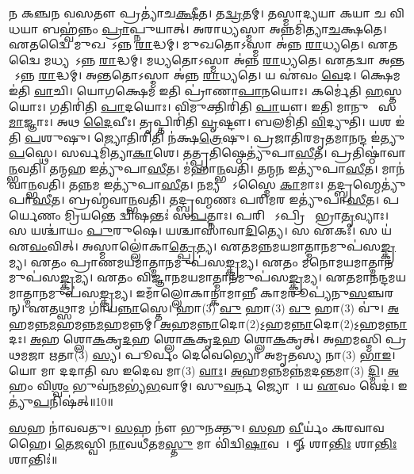 𑌨 𑌕𑌞𑍍𑌚𑌨 𑌵𑌸𑌤𑍗 𑌪𑍍𑌰𑌤𑍍𑌯𑌾॑𑌚\ul{𑌕𑍍𑌷𑍀}𑌤। 
𑌤\ul{𑌦𑍍𑌵𑍍𑌰}𑌤𑌮𑍍। 
𑌤𑌸𑍍𑌮𑌾𑌦𑍍𑌯𑌯𑌾 𑌕𑌯𑌾 𑌚 𑌵𑌿𑌧𑌯𑌾 𑌬𑌹𑍍𑌵॑𑌨𑍍𑌨𑌂 \ul{𑌪𑍍𑌰𑌾}𑌪𑍍𑌨𑍁𑌯𑌾𑌤𑍍। 
𑌅𑌰𑌾𑌧𑍍𑌯𑌸𑍍𑌮𑌾 𑌅𑌨𑍍𑌨𑌮𑌿॑𑌤𑍍𑌯𑌾\ul{𑌚}𑌕𑍍𑌷𑌤𑍇। 
𑌏𑌤𑌦𑍍𑌵𑍈 𑌮𑍁𑌖𑌤𑍋᳚𑌽𑌨𑍍𑌨 \ul{𑌰𑌾}𑌦𑍍𑌧𑌮𑍍। 
𑌮𑍁𑌖𑌤𑍋𑌽𑌸𑍍𑌮𑌾 𑌅॑𑌨𑍍𑌨 \ul{𑌰𑌾}𑌧𑍍𑌯𑌤𑍇। 
𑌏𑌤𑌦𑍍𑌵𑍈 𑌮𑌧𑍍𑌯𑌤𑍋᳚𑌽𑌨𑍍𑌨 \ul{𑌰𑌾}𑌦𑍍𑌧𑌮𑍍। 
𑌮𑌧𑍍𑌯𑌤𑍋𑌽𑌸𑍍𑌮𑌾 𑌅॑𑌨𑍍𑌨 \ul{𑌰𑌾}𑌧𑍍𑌯𑌤𑍇। 
𑌏𑌤𑌦𑍍𑌵𑌾 𑌅𑌨𑍍𑌤𑌤𑍋᳚𑌽𑌨𑍍𑌨 \ul{𑌰𑌾}𑌦𑍍𑌧𑌮𑍍। 
𑌅𑌨𑍍𑌤𑌤𑍋𑌽𑌸𑍍𑌮𑌾 𑌅॑𑌨𑍍𑌨 \ul{𑌰𑌾}𑌧𑍍𑌯𑌤𑍇। 
𑌯 𑌏॑𑌵𑌂 \ul{𑌵𑍇}𑌦। 
𑌕𑍍𑌷𑍇𑌮 𑌇॑𑌤𑌿 \ul{𑌵𑌾}𑌚𑌿। 
𑌯𑍋𑌗𑌕𑍍𑌷𑍇𑌮 𑌇𑌤𑌿 𑌪𑍍𑌰𑌾॑𑌣𑌾\ul{𑌪𑌾}𑌨𑌯𑍋𑌃। 
𑌕𑌰𑍍𑌮𑍇॑𑌤𑌿 \ul{𑌹}𑌸𑍍𑌤𑌯𑍋𑌃। 
𑌗𑌤𑌿𑌰𑌿॑𑌤𑌿 \ul{𑌪𑌾}𑌦𑌯𑍋𑌃। 
𑌵𑌿𑌮𑍁𑌕𑍍𑌤𑌿𑌰𑌿॑𑌤𑌿 \ul{𑌪𑌾}𑌯𑍗। 
𑌇𑌤𑌿 𑌮𑌾𑌨𑍁𑌷𑍀𑌃᳚ 𑌸\ul{𑌮𑌾}𑌜𑍍𑌞𑌾𑌃। 
𑌅𑌥 \ul{𑌦𑍈}𑌵𑍀𑌃। 
𑌤𑍃𑌪𑍍𑌤𑌿𑌰𑌿॑𑌤𑌿 \ul{𑌵𑍃}𑌷𑍍𑌟𑍗। 
𑌬𑌲𑌮𑌿॑𑌤𑌿 \ul{𑌵𑌿}𑌦𑍍𑌯𑍁𑌤𑌿। 
𑌯𑌶 𑌇॑𑌤𑌿 \ul{𑌪}𑌶𑍁𑌷𑍁। 
𑌜𑍍𑌯𑍋𑌤𑌿𑌰𑌿𑌤𑌿 𑌨॑𑌕𑍍𑌷\ul{𑌤𑍍𑌰𑍇}𑌷𑍁। 
𑌪𑍍𑌰𑌜𑌾𑌤𑌿𑌰𑌮𑍃𑌤𑌮𑌾𑌨𑌨𑍍𑌦 𑌇॑𑌤𑍍𑌯𑍁\ul{𑌪}𑌸𑍍𑌥𑍇। 
𑌸𑌰𑍍𑌵𑌮𑌿॑𑌤𑍍𑌯𑌾\ul{𑌕𑌾}𑌶𑍇। 
𑌤𑌤𑍍𑌪𑍍𑌰𑌤𑌿𑌷𑍍𑌠𑍇𑌤𑍍𑌯𑍁॑𑌪𑌾\ul{𑌸𑍀}𑌤। 
𑌪𑍍𑌰𑌤𑌿𑌷𑍍𑌠𑌾॑𑌵𑌾\ul{𑌨𑍍𑌭}𑌵𑌤𑌿। 
𑌤𑌨𑍍𑌮𑌹 𑌇𑌤𑍍𑌯𑍁॑𑌪𑌾\ul{𑌸𑍀}𑌤। 
𑌮॑𑌹𑌾\ul{𑌨𑍍𑌭}𑌵𑌤𑌿। 
𑌤𑌨𑍍𑌮𑌨 𑌇𑌤𑍍𑌯𑍁॑𑌪𑌾\ul{𑌸𑍀}𑌤। 
𑌮𑌾𑌨॑𑌵𑌾\ul{𑌨𑍍𑌭}𑌵𑌤𑌿। 
𑌤𑌨𑍍𑌨𑌮 𑌇𑌤𑍍𑌯𑍁॑𑌪𑌾\ul{𑌸𑍀}𑌤। 
𑌨𑌮𑍍𑌯𑌨𑍍𑌤𑍇᳚𑌽𑌸𑍍𑌮𑍈 \ul{𑌕𑌾}𑌮𑌾𑌃। 
𑌤𑌦𑍍𑌬𑍍𑌰𑌹𑍍𑌮𑍇𑌤𑍍𑌯𑍁॑𑌪𑌾\ul{𑌸𑍀}𑌤। 
𑌬𑍍𑌰𑌹𑍍𑌮॑𑌵𑌾\ul{𑌨𑍍𑌭}𑌵𑌤𑌿। 
𑌤𑌦𑍍𑌬𑍍𑌰𑌹𑍍𑌮𑌣𑌃 𑌪𑌰𑌿𑌮𑌰 𑌇𑌤𑍍𑌯𑍁॑𑌪𑌾\ul{𑌸𑍀}𑌤। 
𑌪𑌰𑍍𑌯𑍇𑌣𑌂 𑌮𑍍𑌰𑌿𑌯𑌨𑍍𑌤𑍇 𑌦𑍍𑌵𑌿𑌷𑌨𑍍𑌤𑌃॑ 𑌸\ul{𑌪}𑌤𑍍𑌨𑌾𑌃। 
𑌪𑌰𑌿 𑌯𑍇᳚𑌽𑌪𑍍𑌰𑌿𑌯𑌾᳚ 𑌭𑍍𑌰𑌾\ul{𑌤𑍃}𑌵𑍍𑌯𑌾𑌃। 
𑌸 𑌯𑌶𑍍𑌚𑌾॑𑌯𑌂 \ul{𑌪𑍁}𑌰𑍁𑌷𑍇। 
𑌯𑌶𑍍𑌚𑌾𑌸𑌾॑𑌵𑌾\ul{𑌦𑌿}𑌤𑍍𑌯𑍇। 
𑌸 𑌏𑌕𑌃॑। 
𑌸 𑌯॑ 𑌏\ul{𑌵𑌂}𑌵𑌿𑌤𑍍। 
𑌅𑌸𑍍𑌮𑌾𑌲𑍍𑌲𑍋॑𑌕𑌾\ul{𑌤𑍍𑌪𑍍𑌰𑍇}𑌤𑍍𑌯। 
𑌏𑌤𑌮𑌨𑍍𑌨𑌮𑌯𑌮𑌾𑌤𑍍𑌮𑌾𑌨𑌮𑍁𑌪॑𑌸\ul{𑌙𑍍𑌕𑍍𑌰}𑌮𑍍𑌯। 
𑌏𑌤𑌂 𑌪𑍍𑌰𑌾𑌣𑌮𑌯𑌮𑌾𑌤𑍍𑌮𑌾𑌨𑌮𑍁𑌪॑𑌸\ul{𑌙𑍍𑌕𑍍𑌰}𑌮𑍍𑌯। 
𑌏𑌤𑌂 𑌮𑌨𑍋𑌮𑌯𑌮𑌾𑌤𑍍𑌮𑌾𑌨𑌮𑍁𑌪॑\-𑌸\ul{𑌙𑍍𑌕𑍍𑌰}𑌮𑍍𑌯। 
𑌏𑌤𑌂 𑌵𑌿𑌜𑍍𑌞𑌾𑌨𑌮𑌯𑌮𑌾𑌤𑍍𑌮𑌾𑌨𑌮𑍁𑌪॑\-𑌸\ul{𑌙𑍍𑌕𑍍𑌰}𑌮𑍍𑌯। 
𑌏𑌤𑌮𑌾𑌨𑌨𑍍𑌦𑌮𑌯\-𑌮𑌾𑌤𑍍𑌮𑌾𑌨𑌮𑍁𑌪॑𑌸\ul{𑌙𑍍𑌕𑍍𑌰}𑌮𑍍𑌯। 
𑌇𑌮𑌾𑌁𑌲𑍍𑌲𑍋𑌕𑌾𑌨𑍍𑌕𑌾𑌮𑌾𑌨𑍍𑌨𑍀 𑌕𑌾𑌮𑌰𑍂𑌪𑍍𑌯॑𑌨𑍁\-\ul{𑌸}𑌞𑍍𑌚𑌰𑌨𑍍। 
𑌏𑌤𑌥𑍍𑌸𑌾𑌮 𑌗𑌾॑𑌯\ul{𑌨𑍍𑌨𑌾}𑌸𑍍𑌤𑍇। 
𑌹𑌾(3) \ul{𑌵𑍁} 𑌹𑌾(3) \ul{𑌵𑍁} 𑌹𑌾(3) 𑌵𑍁॑। 
\ul{𑌅}𑌹𑌮𑌨𑍍𑌨\ul{𑌮}𑌹𑌮𑌨𑍍𑌨\ul{𑌮}𑌹𑌮𑌨𑍍𑌨𑌮𑍍। 
\ul{𑌅}𑌹𑌮\ul{𑌨𑍍𑌨𑌾}𑌦𑍋(2)\-𑌽॒𑌹𑌮\ul{𑌨𑍍𑌨𑌾}𑌦𑍋(2)\-𑌽॒𑌹𑌮\ul{𑌨𑍍𑌨𑌾}𑌦𑌃। 
\ul{𑌅}𑌹 𑌶𑍍𑌲𑍋\ul{𑌕}𑌕𑍃\ul{𑌦}𑌹 𑌶𑍍𑌲𑍋\ul{𑌕}𑌕𑍃\ul{𑌦}𑌹 𑌶𑍍𑌲𑍋\ul{𑌕}𑌕𑍃𑌤𑍍। 
𑌅𑌹𑌮𑌸𑍍𑌮𑌿 𑌪𑍍𑌰𑌥𑌮𑌜𑌾 𑌋𑌤𑌾(3) \ul{𑌸𑍍𑌯}। 
𑌪𑍂𑌰𑍍𑌵𑌂 𑌦𑍇𑌵𑍇𑌭𑍍𑌯𑍋 𑌅𑌮𑍃𑌤𑌸𑍍𑌯 𑌨𑌾(3) \ul{𑌭𑌾}\ul{𑌇}। 
𑌯𑍋 𑌮𑌾 𑌦𑌦𑌾𑌤𑌿 𑌸 𑌇𑌦𑍇𑌵 𑌮𑌾(3) \ul{𑌵𑌾𑌃}। 
\ul{𑌅}𑌹𑌮\ul{𑌨𑍍𑌨}𑌮𑌨𑍍𑌨॑\ul{𑌮}𑌦\ul{𑌨𑍍𑌤}𑌮𑌾(3) \ul{𑌦𑍍𑌮𑌿}। 
\ul{𑌅}𑌹𑌂 𑌵𑌿\ul{𑌶𑍍𑌵𑌂} 𑌭𑍁𑌵॑\ul{𑌨}𑌮𑌭𑍍𑌯॑\ul{𑌭}𑌵𑌾𑌮𑍍। 
𑌸𑍁\ul{𑌵}𑌰𑍍𑌨 𑌜𑍍𑌯𑍋𑌤𑍀𑌃᳚। 
𑌯 \ul{𑌏}𑌵𑌂 𑌵𑍇𑌦॑। 
𑌇𑌤𑍍𑌯𑍁॑\ul{𑌪}𑌨𑌿𑌷॑𑌤𑍍॥10॥

\ul{𑌸}𑌹 𑌨𑌾॑𑌵𑌵𑌤𑍁। 
\ul{𑌸}𑌹 𑌨𑍗॑ 𑌭𑍁𑌨𑌕𑍍𑌤𑍁। 
\ul{𑌸}𑌹 \ul{𑌵𑍀}𑌰𑍍𑌯𑌂॑ 𑌕𑌰𑌵𑌾𑌵𑌹𑍈। 
\ul{𑌤𑍇}\ul{𑌜}𑌸𑍍𑌵𑌿 \ul{𑌨𑌾}𑌵𑌧𑍀॑𑌤𑌮\ul{𑌸𑍍𑌤𑍁} 𑌮𑌾 𑌵𑌿॑𑌦𑍍𑌵𑌿\ul{𑌷𑌾}𑌵𑌹𑍈᳚। 
𑍐 𑌶𑌾\ul{𑌨𑍍𑌤𑌿𑌃} 𑌶𑌾\ul{𑌨𑍍𑌤𑌿𑌃} 𑌶𑌾𑌨𑍍𑌤𑌿𑌃॑॥

\closesection


